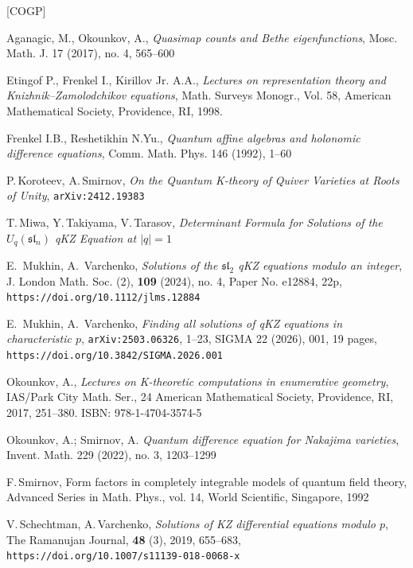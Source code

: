 \documentclass[12pt]{amsart}
\let\frak\mathfrak
\theoremstyle{definition} %
\numberwithin{equation}{section}
\theoremstyle{definition}
\let\bi\bibitem
\begin{document}
\bigskip
\begin{thebibliography}{[COGP]}
\normalsize
\frenchspacing
\raggedbottom

\bi[AO]{AO}
Aganagic, M., Okounkov, A.,
{\it Quasimap counts and Bethe eigenfunctions},
Mosc. Math. J. 17 (2017), no. 4, 565--600

\bi[EFK]{EFK}
Etingof P., Frenkel I., Kirillov Jr. A.A.,
{\it Lectures on representation theory and Knizhnik--Zamolodchikov
equations}, Math. Surveys Monogr., Vol. 58, American Mathematical Society, Providence, RI, 1998.

\bi[FR]{FR}
Frenkel I.B., Reshetikhin N.Yu., {\it
Quantum affine algebras and holonomic difference equations}, Comm. Math.
Phys. 146 (1992), 1--60

\bi[KS]{KS} P.\,Koroteev, A.\,Smirnov, {\it On the Quantum K-theory of Quiver Varieties at Roots of Unity}, {\tt arXiv:2412.19383}

\bi[MTT]{MTT} T.\,Miwa, Y.\,Takiyama, V.\,Tarasov,
{\it Determinant Formula for Solutions of
the $U_q(\frak{sl}_n)$ qKZ Equation at $|q| = 1$}

\bi[MV1]{MV1}
E.~Mukhin, A.~Varchenko, {\it Solutions of the $\frak{sl}_2$ qKZ equations modulo an integer},
J. London Math. Soc. (2), {\bf 109} (2024), no. 4, Paper No. e12884, 22p,
\\
{\tt https://doi.org/10.1112/jlms.12884}

\bi[MV2]{MV2}
E.~Mukhin, A.~Varchenko,
{\it Finding all solutions of qKZ equations in characteristic $p$},
{\tt arXiv:2503.06326}, 1--23, SIGMA 22 (2026), 001, 19 pages,
\\
{\tt https://doi.org/10.3842/SIGMA.2026.001}

\bi[O]{O} Okounkov, A., {\it Lectures on K-theoretic computations in enumerative geometry},
IAS/Park City Math. Ser., 24
American Mathematical Society, Providence, RI, 2017, 251--380.
ISBN: 978-1-4704-3574-5

\bi[OS]{OS}
Okounkov, A.; Smirnov, A. {\it
Quantum difference equation for Nakajima varieties},
Invent. Math. 229 (2022), no. 3, 1203--1299

\bi[S]{S} F.\,Smirnov, {Form factors in completely integrable models of quantum field theory}, Advanced Series in Math. Phys., vol. 14, World Scientific, Singapore, 1992

\bi[SV]{SV} V.\,Schechtman, A.\,Varchenko,
{\it
Solutions of KZ differential equations modulo $p$},
The Ramanujan Journal,
{\bf 48} (3), 2019, 655--683,
{\tt https://doi.org/10.1007/s11139-018-0068-x}


\end{thebibliography}
\end{document}
